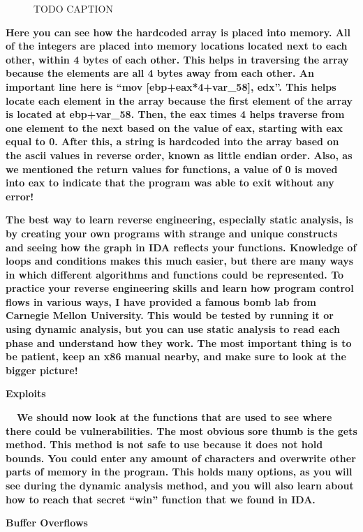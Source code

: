 \documentclass[letterpaper]{article}
\newcommand{\sitfig}[3]{
\begin{figure}[H]
\centering
\makebox[\textwidth][c]{
#2
}
\caption{#3}
\label{#1}
\end{figure}
}
\newcommand{\sitgfx}[4][scale=1.0]{
\sitfig{#3}{\texttt{[image: \#2]}}{#4}
}
\begin{document}
  
\sitgfx[width=6.5in,height=4.5311in]{FINALWORKINGDOCFORMERLYPRECURSOR-img072.png}{fig:unk}{TODO CAPTION}
 

\textbf{Here you can see how the hardcoded array is placed into memory. All of the integers are placed into memory
locations located next to each other, within 4 bytes of each other. This helps in traversing the array because the
elements are all 4 bytes away from each other. An important line here is ``mov [ebp+eax*4+var\_58], edx''. This helps
locate each element in the array because the first element of the array is located at ebp+var\_58. Then, the eax times
4 helps traverse from one element to the next based on the value of eax, starting with eax equal to 0. After this, a
string is hardcoded into the array based on the ascii values in reverse order, known as little endian order. Also, as
we mentioned the return values for functions, a value of 0 is moved into eax to indicate that the program was able to
exit without any error!}

\textbf{The best way to learn reverse engineering, especially static analysis, is by creating your own programs with
strange and unique constructs and seeing how the graph in IDA reflects your functions. Knowledge of loops and
conditions makes this much easier, but there are many ways in which different algorithms and functions could be
represented. To practice your reverse engineering skills and learn how program control flows in various ways, I have
provided a famous bomb lab from Carnegie Mellon University. This would be tested by running it or using dynamic
analysis, but you can use static analysis to read each phase and understand how they work. The most important thing is
to be patient, keep an x86 manual nearby, and make sure to look at the bigger picture!}

{\centering
\textbf{Exploits}
\par}

\textbf{ \ \ We should now look at the functions that are used to see where there could be vulnerabilities. The most
obvious sore thumb is the gets method. This method is not safe to use because it does not hold bounds. You could enter
any amount of characters and overwrite other parts of memory in the program. This holds many options, as you will see
during the dynamic analysis method, and you will also learn about how to reach that secret ``win'' function that we
found in IDA.}

{\centering
\textbf{Buffer Overflows}
\par}
\end{document}
